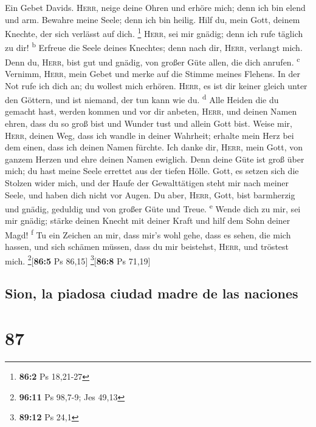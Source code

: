  Ein Gebet Davids. \textsc{Herr}, neige deine Ohren und
erhöre mich; denn ich bin elend und arm.  Bewahre meine
Seele; denn ich bin heilig. Hilf du, mein Gott, deinem Knechte, der sich
verlässt auf dich. \footnote{\textbf{86:2} Ps 18,21-27} 
\textsc{Herr}, sei mir gnädig; denn ich rufe täglich zu dir!
\textsuperscript{b}  Erfreue die Seele deines Knechtes;
denn nach dir, \textsc{Herr}, verlangt mich.  Denn du,
\textsc{Herr}, bist gut und gnädig, von großer Güte allen, die dich
anrufen. \textsuperscript{c}  Vernimm, \textsc{Herr}, mein
Gebet und merke auf die Stimme meines Flehens.  In der Not
rufe ich dich an; du wollest mich erhören.  \textsc{Herr},
es ist dir keiner gleich unter den Göttern, und ist niemand, der tun
kann wie du. \textsuperscript{d}  Alle Heiden die du
gemacht hast, werden kommen und vor dir anbeten, \textsc{Herr}, und
deinen Namen ehren,  dass du so groß bist und Wunder tust
und allein Gott bist.  Weise mir, \textsc{Herr}, deinen
Weg, dass ich wandle in deiner Wahrheit; erhalte mein Herz bei dem
einen, dass ich deinen Namen fürchte.  Ich danke dir,
\textsc{Herr}, mein Gott, von ganzem Herzen und ehre deinen Namen
ewiglich.  Denn deine Güte ist groß über mich; du hast
meine Seele errettet aus der tiefen Hölle.  Gott, es
setzen sich die Stolzen wider mich, und der Haufe der Gewalttätigen
steht mir nach meiner Seele, und haben dich nicht vor Augen.
 Du aber, \textsc{Herr}, Gott, bist barmherzig und
gnädig, geduldig und von großer Güte und Treue. \textsuperscript{e}
 Wende dich zu mir, sei mir gnädig; stärke deinen Knecht
mit deiner Kraft und hilf dem Sohn deiner Magd! \textsuperscript{f}
 Tu ein Zeichen an mir, dass mir's wohl gehe, dass es
sehen, die mich hassen, und sich schämen müssen, dass du mir beistehst,
\textsc{Herr}, und tröstest mich. \footnote{\textbf{96:11} Ps 98,7-9;
  Jes 49,13}{[}\textbf{86:5} Ps 86,15{]} \footnote{\textbf{89:12} Ps
  24,1}{[}\textbf{86:8} Ps 71,19{]}

\hypertarget{sion-la-piadosa-ciudad-madre-de-las-naciones}{%
\subsection{Sion, la piadosa ciudad madre de las
naciones}\label{sion-la-piadosa-ciudad-madre-de-las-naciones}}

\hypertarget{section-86}{%
\section{87}\label{section-86}}

